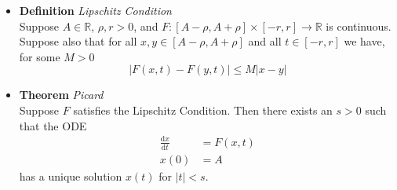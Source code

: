 \documentclass[11pt,a4paper]{article}
\begin{document}
\begin{itemize}

    \item \textbf{Definition} \emph{Lipschitz Condition} \\
        Suppose $A \in \mathbb{R}$, $\rho, r > 0$, and
        $F : [A - \rho, A + \rho] \times [-r, r] \to \mathbb{R}$ is continuous.
        Suppose also that for all $x, y \in [A - \rho, A + \rho]$ and all $t \in [-r, r]$
        we have, for some $M > 0$
        \[
            | F(x, t) - F(y, t) | \leq M|x-y|
        \]

    \item \textbf{Theorem} \emph{Picard} \\
        Suppose $F$ satisfies the Lipschitz Condition.
        Then there exists an $s > 0$ such that the ODE
        \begin{align*}{}
            \frac{\mathrm{d}x}{\mathrm{d}t} &= F(x, t) \\
            x(0) &= A
        \end{align*}
        has a unique solution $x(t)$ for $|t| < s$.
        
\end{itemize}
\end{document}
